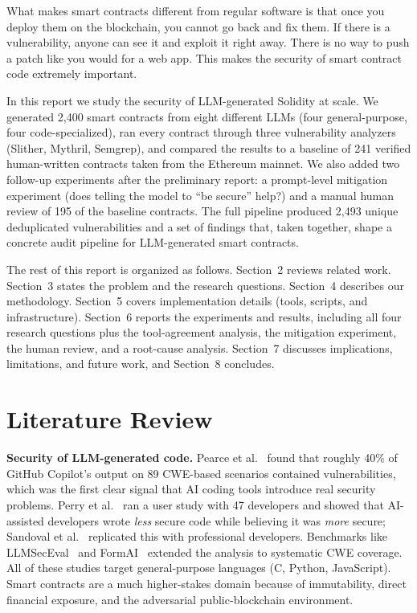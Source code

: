 \documentclass[11pt]{article}
\begin{document}
What makes smart contracts different from regular software is that once you deploy them on the blockchain, you cannot go back and fix them. If there is a vulnerability, anyone can see it and exploit it right away. There is no way to push a patch like you would for a web app. This makes the security of smart contract code extremely important.

In this report we study the security of LLM-generated Solidity at scale. We generated 2,400 smart contracts from eight different LLMs (four general-purpose, four code-specialized), ran every contract through three vulnerability analyzers (Slither, Mythril, Semgrep), and compared the results to a baseline of 241 verified human-written contracts taken from the Ethereum mainnet. We also added two follow-up experiments after the preliminary report: a prompt-level mitigation experiment (does telling the model to ``be secure'' help?) and a manual human review of 195 of the baseline contracts. The full pipeline produced 2,493 unique deduplicated vulnerabilities and a set of findings that, taken together, shape a concrete audit pipeline for LLM-generated smart contracts.

The rest of this report is organized as follows. Section~2 reviews related work. Section~3 states the problem and the research questions. Section~4 describes our methodology. Section~5 covers implementation details (tools, scripts, and infrastructure). Section~6 reports the experiments and results, including all four research questions plus the tool-agreement analysis, the mitigation experiment, the human review, and a root-cause analysis. Section~7 discusses implications, limitations, and future work, and Section~8 concludes.

\section{Literature Review}

\textbf{Security of LLM-generated code.} Pearce et al.~\cite{copilot_eval} found that roughly 40\% of GitHub Copilot's output on 89 CWE-based scenarios contained vulnerabilities, which was the first clear signal that AI coding tools introduce real security problems. Perry et al.~\cite{perry2023users} ran a user study with 47 developers and showed that AI-assisted developers wrote \emph{less} secure code while believing it was \emph{more} secure; Sandoval et al.~\cite{sandoval2023lost} replicated this with professional developers. Benchmarks like LLMSecEval~\cite{tony2023llmSecEval} and FormAI~\cite{tihanyi2023formai} extended the analysis to systematic CWE coverage. All of these studies target general-purpose languages (C, Python, JavaScript). Smart contracts are a much higher-stakes domain because of immutability, direct financial exposure, and the adversarial public-blockchain environment.
\end{document}
